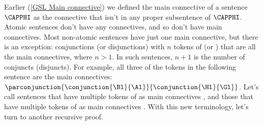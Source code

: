 Earlier (\ref{GSL Main connective}) we defined the main connective of a sentence $\CAPPHI$ as the connective that isn't in any proper subsentence of $\CAPPHI$.  Atomic sentences don't have any connectives, and so don't have main connectives.  Most non-atomic sentences have just one main connective, but there is an exception: conjunctions (or disjunctions) with $n$ tokens of \mention{$\WEDGE$} (or \mention{$\VEE$}) that are all the main connectives, where $n>1$.  In such sentences, $n+1$ is the number of conjuncts (disjuncts).  For example, all three of the \mention{$\WEDGE$} tokens in the following sentence are the main connectives: $\parconjunction{\conjunction{\Bl}{\Al}}{\conjunction{\Hl}{\Gl}}$.  Let's call sentences that have multiple tokens of \mention{$\WEDGE$} as main connectives , and those that have multiple tokens of \mention{$\VEE$} as main connectives .  With this new terminology, let's turn to another recursive proof.

